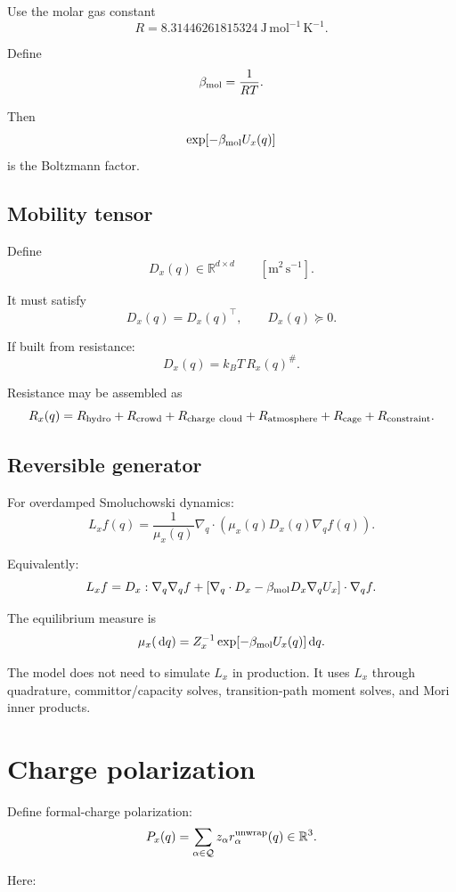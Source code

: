 \documentclass[11pt]{article}
\newcommand{\dd}{\,\mathrm d}
\newcommand{\R}{\mathbb R}
\begin{document}
  Use the molar gas constant
  \[
  R=8.31446261815324\ \mathrm{J\,mol^{-1}\,K^{-1}}.
  \]

  Define
  \[
  \beta_{\rm mol}=\frac{1}{RT}.
  \]

  Then
  \[
  \exp[-\beta_{\rm mol}U_x(q)]
  \]
  is the Boltzmann factor.

  \subsection{Mobility tensor}

  Define
  \[
  D_x(q)\in\R^{d\times d}
  \qquad [\mathrm{m^2\,s^{-1}}].
  \]

  It must satisfy
  \[
  D_x(q)=D_x(q)^\top,
  \qquad
  D_x(q)\succeq0.
  \]

  If built from resistance:
  \[
  D_x(q)=k_BT\,R_x(q)^\#.
  \]

  Resistance may be assembled as
  \[
  R_x(q)
  =
  R_{\rm hydro}
  +
  R_{\rm crowd}
  +
  R_{\rm charge\ cloud}
  +
  R_{\rm atmosphere}
  +
  R_{\rm cage}
  +
  R_{\rm constraint}.
  \]

  \subsection{Reversible generator}

  For overdamped Smoluchowski dynamics:
  \[
  L_x f(q)
  =
  \frac{1}{\mu_x(q)}
  \nabla_q\cdot
  \left(
  \mu_x(q)D_x(q)\nabla_q f(q)
  \right).
  \]

  Equivalently:
  \[
  L_x f
  =
  D_x:\nabla_q\nabla_q f
  +
  \left[
  \nabla_q\cdot D_x
  -
  \beta_{\rm mol}D_x\nabla_q U_x
  \right]\cdot\nabla_q f.
  \]

  The equilibrium measure is
  \[
  \mu_x(\dd q)
  =
  Z_x^{-1}
  \exp[-\beta_{\rm mol}U_x(q)]
  \dd q.
  \]

  The model does not need to simulate \(L_x\) in production. It uses \(L_x\)
  through quadrature, committor/capacity solves, transition-path moment solves,
  and Mori inner products.

  \section{Charge polarization}

  Define formal-charge polarization:
  \[
  P_x(q)=\sum_{\alpha\in\mathcal Q} z_\alpha r_\alpha^{\rm unwrap}(q)
  \in\R^3.
  \]

  Here:
\end{document}

